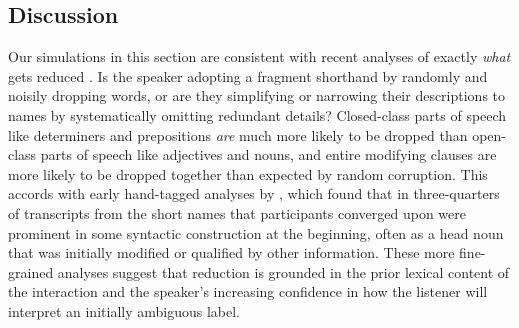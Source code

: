 \subsection{Discussion}

Our simulations in this section are consistent with recent analyses of exactly \emph{what} gets reduced \cite{hawkins2020characterizing}.
Is the speaker adopting a fragment shorthand by randomly and noisily dropping words, or are they simplifying or narrowing their descriptions to names by systematically omitting redundant details?
Closed-class parts of speech like determiners and prepositions \emph{are} much more likely to be dropped than open-class parts of speech like adjectives and nouns, and entire modifying clauses are more likely to be dropped together than expected by random corruption.
This accords with early hand-tagged analyses by , which found that in three-quarters of transcripts from  the short names that participants converged upon were prominent in some syntactic construction at the beginning, often as a head noun that was initially modified or qualified by other information. 
These more fine-grained analyses suggest that reduction is grounded in the prior lexical content of the interaction and the speaker's increasing confidence in how the listener will interpret an initially ambiguous label. 

